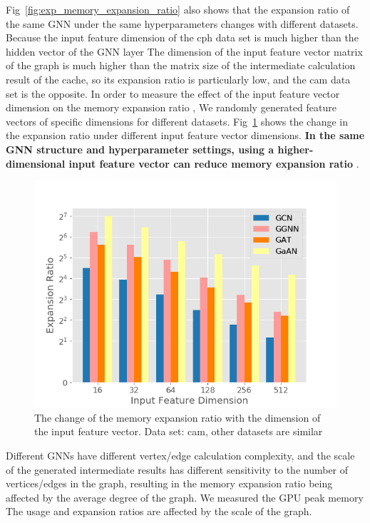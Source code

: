 Fig~\ref{fig:exp_memory_expansion_ratio} also shows that the expansion ratio of the same GNN under the same hyperparameters changes with different datasets.
Because the input feature dimension of the cph data set is much higher than the hidden vector of the GNN layer The dimension of the input feature vector matrix
of the graph is much higher than the matrix size of the intermediate calculation result of the cache, 
so its expansion ratio is particularly low, and the cam data set is the opposite. In order to measure the effect of the input feature vector dimension on the memory
expansion ratio , We randomly generated feature vectors of specific dimensions for different datasets.
Fig~\ref{fig:exp_memory_expension_ratio_input_feature_dimension} shows the change in the expansion ratio under different input feature vector dimensions.
\textbf{In the same GNN structure and hyperparameter settings, using a higher-dimensional input feature vector can reduce memory expansion ratio} .

\begin{figure}
    \centering
    \includegraphics[width=0.7\columnwidth]{figs/experiments/exp_memory_expansion_ratio_input_feature_dimension_com-amazon.png}
    \caption{The change of the memory expansion ratio with the dimension of the input feature vector. Data set: cam, other datasets are similar}
    \label{fig:exp_memory_expension_ratio_input_feature_dimension}
\end{figure}

Different GNNs have different vertex/edge calculation complexity, and the scale of the generated intermediate results has different sensitivity
to the number of vertices/edges in the graph, resulting in the memory expansion ratio being affected by the average degree of the graph.
We measured the GPU peak memory The usage and expansion ratios are affected by the scale of the graph.

